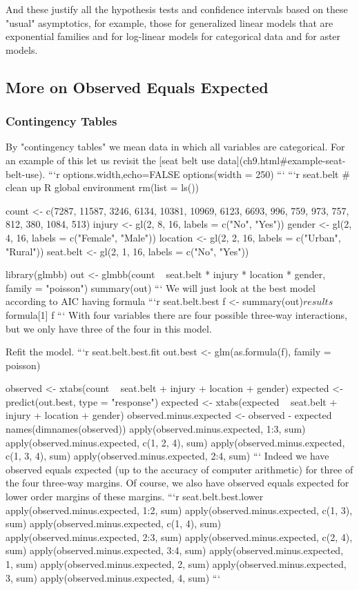 \documentclass[11pt]{article}
\begin{document}
And these justify all the hypothesis tests and confidence intervals
based on these "usual" asymptotics, for example, those
for generalized linear models that are exponential families and for
log-linear models for categorical data and for aster models.

\subsection{More on Observed Equals Expected}

\subsubsection{Contingency Tables}

By "contingency tables" we mean data in which all variables are categorical.
For an example of this let us revisit
the [seat belt use data](ch9.html#example-seat-belt-use).
```{r options.width,echo=FALSE}
options(width = 250)
```
```{r seat.belt}
# clean up R global environment
rm(list = ls())

count <- c(7287, 11587, 3246, 6134, 10381, 10969, 6123, 6693,
            996,   759,  973,  757,   812,   380, 1084,  513)
injury <- gl(2, 8, 16, labels = c("No", "Yes"))
gender <- gl(2, 4, 16, labels = c("Female", "Male"))
location <- gl(2, 2, 16, labels = c("Urban", "Rural"))
seat.belt <- gl(2, 1, 16, labels = c("No", "Yes"))

library(glmbb)
out <- glmbb(count ~ seat.belt * injury * location * gender,
    family = "poisson")
summary(out)
```
We will just look at the best model according to AIC having formula
```{r seat.belt.best}
f <- summary(out)$results$formula[1]
f
```
With four variables there are four possible three-way interactions,
but we only have three of the four in this model.

Refit the model.
```{r seat.belt.best.fit}
out.best <- glm(as.formula(f), family = poisson)

observed <- xtabs(count ~ seat.belt + injury + location + gender)
expected <- predict(out.best, type = "response")
expected <- xtabs(expected ~ seat.belt + injury + location + gender)
observed.minus.expected <- observed - expected
names(dimnames(observed))
apply(observed.minus.expected, 1:3, sum)
apply(observed.minus.expected, c(1, 2, 4), sum)
apply(observed.minus.expected, c(1, 3, 4), sum)
apply(observed.minus.expected, 2:4, sum)
```
Indeed we have observed equals expected (up to the accuracy of computer
arithmetic) for three of the four three-way margins.  Of course, we also
have observed equals expected for lower order margins of these margins.
```{r seat.belt.best.lower}
apply(observed.minus.expected, 1:2, sum)
apply(observed.minus.expected, c(1, 3), sum)
apply(observed.minus.expected, c(1, 4), sum)
apply(observed.minus.expected, 2:3, sum)
apply(observed.minus.expected, c(2, 4), sum)
apply(observed.minus.expected, 3:4, sum)
apply(observed.minus.expected, 1, sum)
apply(observed.minus.expected, 2, sum)
apply(observed.minus.expected, 3, sum)
apply(observed.minus.expected, 4, sum)
```
\end{document}
